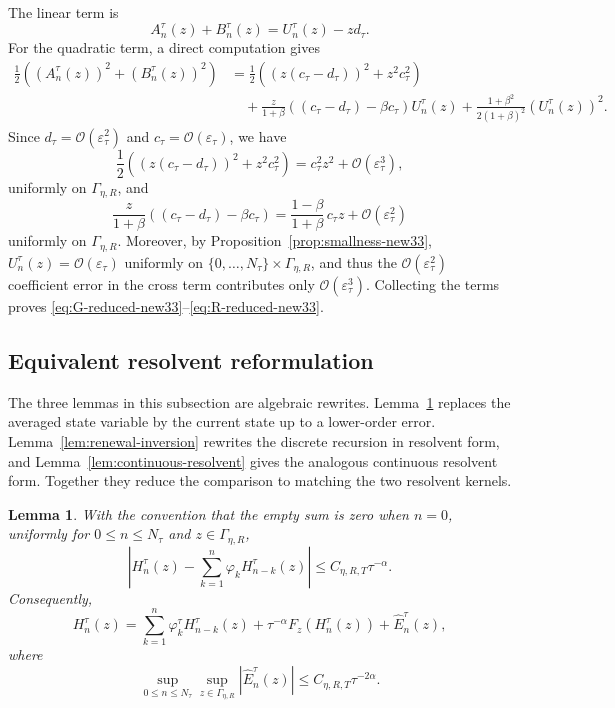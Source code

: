 \documentclass[letterpaper]{article}
\numberwithin{equation}{section}
\newtheorem{lemma}[theorem]{Lemma}
\theoremstyle{definition}
\theoremstyle{remark}
\begin{document}
The linear term is
\[
  A_n^\tau(z)+B_n^\tau(z)=U_n^\tau(z)-zd_\tau.
\]
For the quadratic term, a direct computation gives
\begin{align*}
  \frac12\left((A_n^\tau(z))^2+(B_n^\tau(z))^2\right)
  &=
    \frac12\left((z(c_\tau-d_\tau))^2+z^2c_\tau^2\right) \\
  &\quad
    + \frac{z}{1+\beta}\left((c_\tau-d_\tau)-\beta c_\tau\right)U_n^\tau(z)
    + \frac{1+\beta^2}{2(1+\beta)^2}\left(U_n^\tau(z)\right)^2.
\end{align*}
Since $d_\tau=\mathcal O(\varepsilon_\tau^2)$ and $c_\tau=\mathcal O(\varepsilon_\tau)$, we have
\[
  \frac12\left((z(c_\tau-d_\tau))^2+z^2c_\tau^2\right)
  = c_\tau^2 z^2 + \mathcal O(\varepsilon_\tau^3),
\]
uniformly on $\Gamma_{\eta,R}$, and
\[
  \frac{z}{1+\beta}\left((c_\tau-d_\tau)-\beta c_\tau\right)
  = \frac{1-\beta}{1+\beta}\,c_\tau z + \mathcal O(\varepsilon_\tau^2)
\]
uniformly on $\Gamma_{\eta,R}$.
Moreover, by Proposition~\ref{prop:smallness-new33},
$U_n^\tau(z)=\mathcal O(\varepsilon_\tau)$
uniformly on $\{0,\dots,N_\tau\}\times\Gamma_{\eta,R}$, and thus the $\mathcal O(\varepsilon_\tau^2)$
coefficient error in the cross term contributes only $\mathcal O(\varepsilon_\tau^3)$.
Collecting the terms proves \eqref{eq:G-reduced-new33}--\eqref{eq:R-reduced-new33}.

\subsection{Equivalent resolvent reformulation}\label{app:proof-barH}

The three lemmas in this subsection are algebraic rewrites. Lemma~\ref{lem:barH}
replaces the averaged state variable by the current state up to a lower-order
error. Lemma~\ref{lem:renewal-inversion} rewrites the discrete recursion in
resolvent form, and Lemma~\ref{lem:continuous-resolvent} gives the analogous
continuous resolvent form. Together they reduce the comparison to matching the
two resolvent kernels.

\begin{lemma}
\label{lem:barH}
With the convention that the empty sum is zero when $n=0$, uniformly for
$0\le n\le N_\tau$ and $z\in\Gamma_{\eta,R}$,
\begin{equation}\label{eq:H-barH-close}
  \left|
    H_n^\tau(z)-\sum_{k=1}^n\varphi_k H_{n-k}^\tau(z)
  \right|
  \le C_{\eta,R,T}\tau^{-\alpha}.
\end{equation}
Consequently,
\begin{equation}\label{eq:Htau-rec-local}
  H_n^\tau(z)
  =
  \sum_{k=1}^n\varphi_k^\tau H_{n-k}^\tau(z)
  +\tau^{-\alpha}F_z(H_n^\tau(z))
  +\widehat E_n^\tau(z),
\end{equation}
where
\begin{equation}\label{eq:Ehat-bound}
  \sup_{0\le n\le N_\tau}\sup_{z\in\Gamma_{\eta,R}}
  |\widehat E_n^\tau(z)|
  \le C_{\eta,R,T}\tau^{-2\alpha}.
\end{equation}
\end{lemma}
\end{document}
